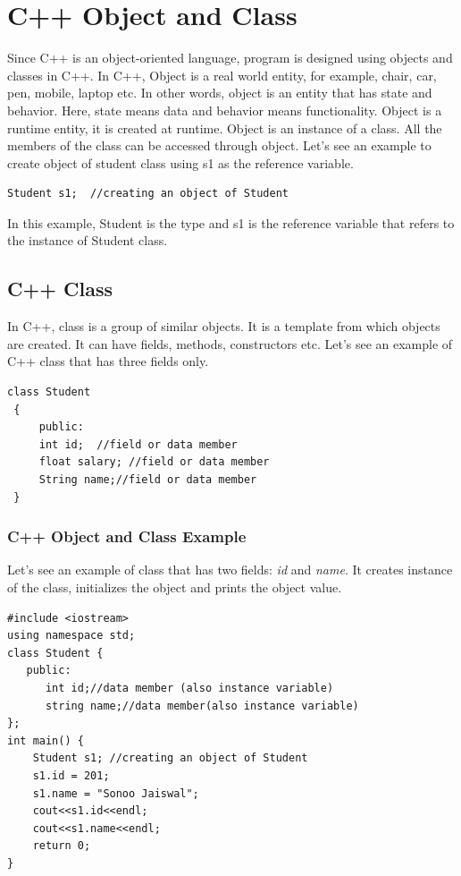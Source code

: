 \documentclass{book}
\begin{document}
\section{C++ Object and Class}

Since C++ is an object-oriented language, program is designed using objects and classes in C++. In C++, Object is a real world entity, for example, chair, car, pen, mobile, laptop etc. In other words, object is an entity that has state and behavior. Here, state means data and behavior means functionality. Object is a runtime entity, it is created at runtime. Object is an instance of a class. All the members of the class can be accessed through object. Let's see an example to create object of student class using s1 as the reference variable.

\begin{verbatim}
Student s1;  //creating an object of Student   
\end{verbatim}

In this example, Student is the type and s1 is the reference variable that refers to the instance of Student class.

\subsection{C++ Class}
In C++, class is a group of similar objects. It is a template from which objects are created. It can have fields, methods, constructors etc. Let's see an example of C++ class that has three fields only.

\begin{lstlisting}
class Student    
 {    
     public:  
     int id;  //field or data member     
     float salary; //field or data member  
     String name;//field or data member    
 }    
\end{lstlisting} 

\subsubsection{C++ Object and Class Example}
Let's see an example of class that has two fields: \textit{id }and \textit{name}. It creates instance of the class, initializes the object and prints the object value.

\begin{lstlisting}
#include <iostream>  
using namespace std;  
class Student {  
   public:  
      int id;//data member (also instance variable)      
      string name;//data member(also instance variable)      
};  
int main() {  
    Student s1; //creating an object of Student   
    s1.id = 201;    
    s1.name = "Sonoo Jaiswal";   
    cout<<s1.id<<endl;  
    cout<<s1.name<<endl;  
    return 0;  
}  
\end{lstlisting} 
\end{document}

